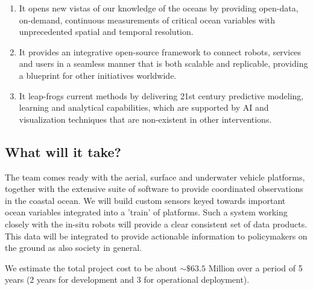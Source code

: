 \documentclass[12pt]{article}
\begin{document}
\begin{enumerate}

\item It opens new vistas of our knowledge of the oceans by providing
  open-data, on-demand, continuous measurements of critical ocean
  variables with unprecedented spatial and temporal resolution.

\item It provides an integrative open-source framework to connect
  robots, services and users in a seamless manner that is both
  scalable and replicable, providing a blueprint for other initiatives
  worldwide.  

\item It leap-frogs current methods by delivering 21st century
  predictive modeling, learning and analytical capabilities, which are
  supported by AI and visualization techniques that are non-existent
  in other interventions.  

\end{enumerate}


\subsection{What will it take?}

The \pro team comes ready with the aerial, surface and underwater
vehicle platforms, together with the extensive suite of software to
provide coordinated observations in the coastal ocean. We will build
custom sensors keyed towards important ocean variables integrated into
a 'train' of \sml platforms.  Such a system working closely with the
in-situ robots will provide a clear consistent set of data
products. This data will be integrated to provide actionable
information to policymakers on the ground as also society in general.

We estimate the total project cost to be about $\sim \$63.5$ Million
over a period of 5 years (2 years for development and 3 for
operational deployment).


\end{document}
